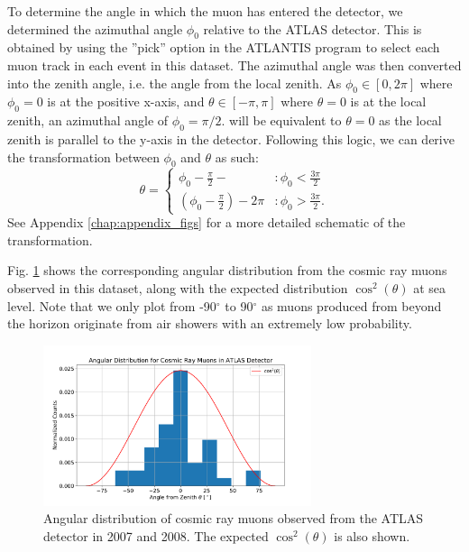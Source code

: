 \documentclass[a4paper]{report}
\numberwithin{equation}{section}
\begin{document}
To determine the angle in which the muon has entered the detector, we determined the azimuthal angle $\phi_0$ relative to the ATLAS detector. 
This is obtained by using the ''pick'' option in the ATLANTIS program to select each muon track in each event in this dataset. The azimuthal 
angle was then converted into the zenith angle, i.e. the angle from the local zenith. As $\phi_0 \in [0, 2\pi]$ where $\phi_0=0$ 
is at the positive x-axis, and $\theta \in [-\pi, \pi]$ where $\theta = 0$ is at the local zenith, an azimuthal angle of $\phi_0 = \pi / 2.$
will be equivalent to $\theta = 0$ as the local zenith is parallel to the y-axis in the detector. Following this logic, we can derive
the transformation between $\phi_0$ and $\theta$ as such: 
\begin{equation}
	\theta = 
	\begin{cases}
		\phi_0 - \frac{\pi}{2} -  & : \phi_0 < \frac{3\pi}{2}\\
		(\phi_0 - \frac{\pi}{2}) - 2\pi & : \phi_0 > \frac{3\pi}{2}.
	\end{cases}
\end{equation}
See Appendix \ref{chap:appendix_figs} for a more detailed schematic of the transformation. \par 

Fig. \ref{fig:muon_angdist} shows the corresponding angular distribution from the cosmic ray muons observed in this dataset, along with the expected 
distribution $\cos^2 (\theta)$ at sea level. Note that we only plot from -90$^\circ$ to 90$^\circ$ as muons produced from beyond the horizon 
originate from air showers with an extremely low probability.\par 
\begin{figure}[htpb]
    \centering
    \includegraphics[width=0.7\textwidth]{muon_angdist.pdf}
    \caption{Angular distribution of cosmic ray muons observed from the ATLAS detector in 2007 and 2008. The expected $\cos^2 (\theta)$
	is also shown.}
    \label{fig:muon_angdist}
\end{figure}
\end{document}
